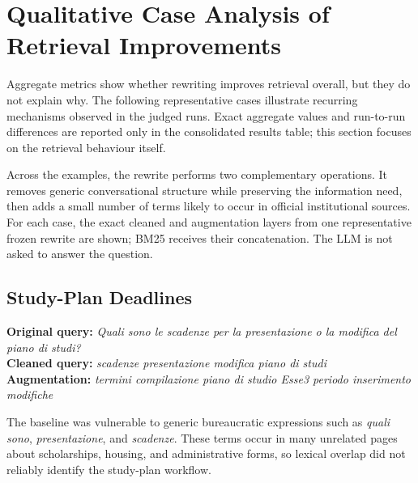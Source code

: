 \section{Qualitative Case Analysis of Retrieval Improvements}
\label{sec:qualitative-case-analysis}

Aggregate metrics show whether rewriting improves retrieval overall, but they do not explain why. The following representative cases illustrate recurring mechanisms observed in the judged runs. Exact aggregate values and run-to-run differences are reported only in the consolidated results table; this section focuses on the retrieval behaviour itself.

Across the examples, the rewrite performs two complementary operations. It removes generic conversational structure while preserving the information need, then adds a small number of terms likely to occur in official institutional sources. For each case, the exact cleaned and augmentation layers from one representative frozen rewrite are shown; BM25 receives their concatenation. The LLM is not asked to answer the question.



\subsection{Study-Plan Deadlines}

\textbf{Original query:} \emph{Quali sono le scadenze per la presentazione o la modifica del piano di studi?}\\
\textbf{Cleaned query:} \emph{scadenze presentazione modifica piano di studi}\\
\textbf{Augmentation:} \emph{termini compilazione piano di studio Esse3 periodo inserimento modifiche}

\begin{failurebox}
The baseline was vulnerable to generic bureaucratic expressions such as \emph{quali sono}, \emph{presentazione}, and \emph{scadenze}. These terms occur in many unrelated pages about scholarships, housing, and administrative forms, so lexical overlap did not reliably identify the study-plan workflow.
\end{failurebox}

